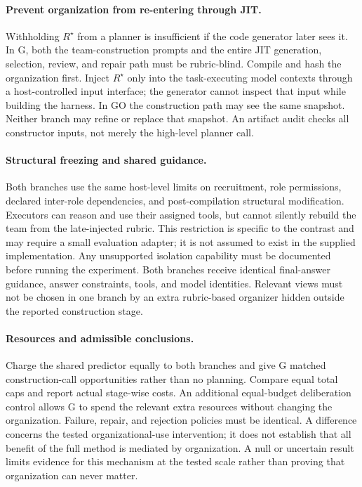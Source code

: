 \paragraph{Prevent organization from re-entering through JIT.}
Withholding $R^{\star}$ from a planner is insufficient if the code generator later sees it. In G, both the team-construction prompts and the entire JIT generation, selection, review, and repair path must be rubric-blind. Compile and hash the organization first. Inject $R^{\star}$ only into the task-executing model contexts through a host-controlled input interface; the generator cannot inspect that input while building the harness. In GO the construction path may see the same snapshot. Neither branch may refine or replace that snapshot. An artifact audit checks all constructor inputs, not merely the high-level planner call.

\paragraph{Structural freezing and shared guidance.}
Both branches use the same host-level limits on recruitment, role permissions, declared inter-role dependencies, and post-compilation structural modification. Executors can reason and use their assigned tools, but cannot silently rebuild the team from the late-injected rubric. This restriction is specific to the contrast and may require a small evaluation adapter; it is not assumed to exist in the supplied implementation. Any unsupported isolation capability must be documented before running the experiment. Both branches receive identical final-answer guidance, answer constraints, tools, and model identities. Relevant views must not be chosen in one branch by an extra rubric-based organizer hidden outside the reported construction stage.

\paragraph{Resources and admissible conclusions.}
Charge the shared predictor equally to both branches and give G matched construction-call opportunities rather than no planning. Compare equal total caps and report actual stage-wise costs. An additional equal-budget deliberation control allows G to spend the relevant extra resources without changing the organization. Failure, repair, and rejection policies must be identical. A difference concerns the tested organizational-use intervention; it does not establish that all benefit of the full method is mediated by organization. A null or uncertain result limits evidence for this mechanism at the tested scale rather than proving that organization can never matter.

